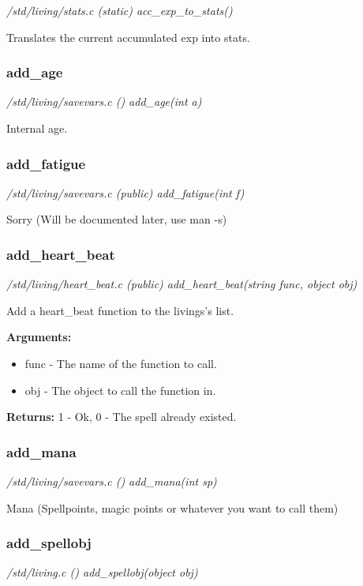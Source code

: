 {\em /std/living/stats.c (static) acc\_exp\_to\_stats()}

Translates the current accumulated exp into stats.


\subsubsection{add\_age}

{\em /std/living/savevars.c () add\_age(int a)}

Internal age.


\subsubsection{add\_fatigue}

{\em /std/living/savevars.c (public) add\_fatigue(int f)}

Sorry (Will be documented later, use man -s)


\subsubsection{add\_heart\_beat}

{\em /std/living/heart\_beat.c (public) add\_heart\_beat(string func, object obj)}

Add a heart\_beat function to the livings's list.

{\bf Arguments:}
\begin{itemize}
\item     func - The name of the function to call.
\item obj - The object to call the function in. 
\end{itemize}

{\bf Returns:}        1 - Ok, 0 - The spell already existed.


\subsubsection{add\_mana}

{\em /std/living/savevars.c () add\_mana(int sp)}

Mana 
(Spellpoints, magic points or whatever you want to call them)


\subsubsection{add\_spellobj}

{\em /std/living.c () add\_spellobj(object obj)}

